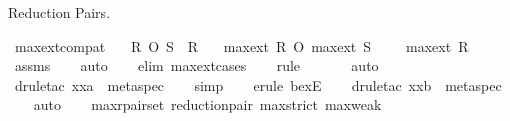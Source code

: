 \begin{isabellebody}
\endisatagproof
{\isafoldproof}%
%
\isadelimproof
%
\endisadelimproof
%
\begin{isamarkuptext}%
Reduction Pairs.%
\end{isamarkuptext}\isamarkuptrue%
\isamarkupfalse%
\ max{\isacharunderscore}{\kern0pt}ext{\isacharunderscore}{\kern0pt}compat{\isacharcolon}{\kern0pt}\isanewline
\ \ \ {\isachardoublequoteopen}R\ O\ S\ {\isasymsubseteq}\ R{\isachardoublequoteclose}\isanewline
\ \ \ {\isachardoublequoteopen}max{\isacharunderscore}{\kern0pt}ext\ R\ O\ {\isacharparenleft}{\kern0pt}max{\isacharunderscore}{\kern0pt}ext\ S\ {\isasymunion}\ {\isacharbraceleft}{\kern0pt}{\isacharparenleft}{\kern0pt}{\isacharbraceleft}{\kern0pt}{\isacharbraceright}{\kern0pt}{\isacharcomma}{\kern0pt}\ {\isacharbraceleft}{\kern0pt}{\isacharbraceright}{\kern0pt}{\isacharparenright}{\kern0pt}{\isacharbraceright}{\kern0pt}{\isacharparenright}{\kern0pt}\ {\isasymsubseteq}\ max{\isacharunderscore}{\kern0pt}ext\ R{\isachardoublequoteclose}\isanewline
%
\isadelimproof
\ \ %
\endisadelimproof
%
\isatagproof
{}\isamarkupfalse%
\ assms\isanewline
\ \ \isamarkupfalse%
\ auto\isanewline
\ \ \isamarkupfalse%
\ {\isacharparenleft}{\kern0pt}elim\ max{\isacharunderscore}{\kern0pt}ext{\isachardot}{\kern0pt}cases{\isacharparenright}{\kern0pt}\isanewline
\ \ \isamarkupfalse%
\ rule\isanewline
\ \ \ \ \ \isamarkupfalse%
\ auto{\isacharbrackleft}{\kern0pt}{}{\isacharbrackright}{\kern0pt}\isanewline
\ \ \isamarkupfalse%
\ {\isacharparenleft}{\kern0pt}drule{\isacharunderscore}{\kern0pt}tac\ x{\isacharequal}{\kern0pt}xa\ \ meta{\isacharunderscore}{\kern0pt}spec{\isacharparenright}{\kern0pt}\isanewline
\ \ \isamarkupfalse%
\ simp\isanewline
\ \ \isamarkupfalse%
\ {\isacharparenleft}{\kern0pt}erule\ bexE{\isacharparenright}{\kern0pt}\isanewline
\ \ \isamarkupfalse%
\ {\isacharparenleft}{\kern0pt}drule{\isacharunderscore}{\kern0pt}tac\ x{\isacharequal}{\kern0pt}xb\ \ meta{\isacharunderscore}{\kern0pt}spec{\isacharparenright}{\kern0pt}\isanewline
\ \ \isamarkupfalse%
\ auto\isanewline
\ \ \isamarkupfalse%
%
\endisatagproof
{\isafoldproof}%
%
\isadelimproof
\isanewline
%
\endisadelimproof
\isanewline
{}\isamarkupfalse%
\ max{\isacharunderscore}{\kern0pt}rpair{\isacharunderscore}{\kern0pt}set{\isacharcolon}{\kern0pt}\ {\isachardoublequoteopen}reduction{\isacharunderscore}{\kern0pt}pair\ {\isacharparenleft}{\kern0pt}max{\isacharunderscore}{\kern0pt}strict{\isacharcomma}{\kern0pt}\ max{\isacharunderscore}{\kern0pt}weak{\isacharparenright}{\kern0pt}{\isachardoublequoteclose}\isanewline

\end{isabellebody}
